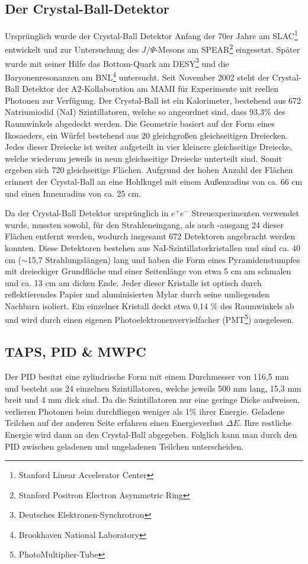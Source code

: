 \documentclass[a4paper,11pt,oneside,final,german,openbib,pdftex]{scrbook}
\begin{document}
{\subsection{Der Crystal-Ball-Detektor}
Ursprünglich wurde der Crystal-Ball Detektor Anfang der 70er Jahre am SLAC\footnote{Stanford Linear Accelerator Center} entwickelt und zur Untersuchung des $J/\Psi$-Mesons am SPEAR\footnote{Stanford Positron Electron Asymmetric Ring} eingesetzt. Später wurde mit seiner Hilfe das Bottom-Quark am DESY\footnote{Deutsches Elektronen-Synchrotron} und die Baryonenresonanzen am BNL\footnote{Brookhaven National Laboratory} untersucht.
Seit November 2002 steht der Crystal-Ball Detektor der A2-Kollaboration am MAMI für Experimente mit reellen Photonen zur Verfügung.
\newline
Der Crystal-Ball ist ein Kalorimeter, bestehend aus 672 Natriumiodid (NaI) Szintillatoren, welche so angeordnet sind, dass 93,3\% des Raumwinkels abgedeckt werden. Die Geometrie basiert auf der Form eines Ikosaeders, ein W\"urfel bestehend aus 20 gleichgro{\ss}en gleichseitigen Dreiecken. Jedes dieser Dreiecke ist weiter aufgeteilt in vier kleinere gleichseitige Dreiecke, welche wiederum jeweils in neun gleichseitige Dreiecke unterteilt sind. Somit ergeben sich 720 gleichseitige Fl\"achen. Aufgrund der hohen Anzahl der Fl\"achen erinnert der Crystal-Ball an eine Hohlkugel mit einem Au{\ss}enradius von ca. 66 cm und einen Innenradius von ca. 25 cm. 

Da der Crystal-Ball Detektor urspr\"unglich in $e^+e^-$ Streuexperimenten verwendet wurde, mussten sowohl, f\"ur den Strahleneingang, als auch -ausgang 24 dieser Fl\"achen entfernt werden, wodurch insgesamt 672 Detektoren angebracht werden konnten. Diese Detektoren bestehen aus NaI-Szintillatorkristallen und sind ca. 40 cm ($\sim$15,7 Strahlungsl\"angen) lang und haben die Form eines Pyramidenstumpfes mit dreieckiger Grundfl\"ache und einer Seitenl\"ange von etwa 5 cm am schmalen und ca. 13 cm am dicken Ende. Jeder dieser Kristalle ist optisch durch reflektierendes Papier und aluminisierten Mylar durch seine umliegenden Nachbarn isoliert. Ein einzelner Kristall deckt etwa 0,14 \% des Raumwinkels ab und wird durch einen eigenen Photoelektronenvervielfacher (PMT\footnote{PhotoMultiplier-Tube}) ausgelesen. 



\subsection{TAPS, PID \& MWPC}
\label{sec:TAPS-PID-MWPC}
Der PID besitzt eine zylindrische Form mit einem Durchmesser von 116,5 mm und besteht aus 24 einzelnen Szintillatoren, welche jeweils 500 mm lang, 15,3 mm breit und 4 mm dick sind. Da die Szintillatoren nur eine geringe Dicke aufweisen, verlieren Photonen beim durchfliegen weniger als 1\% ihrer Energie. Geladene Teilchen auf der anderen Seite erfahren einen Energieverlust $\Delta E$. Ihre restliche Energie wird dann an den Crystal-Ball abgegeben. Folglich kann man durch den PID zwischen geladenen und ungeladenen Teilchen unterscheiden. 

}
\end{document}
